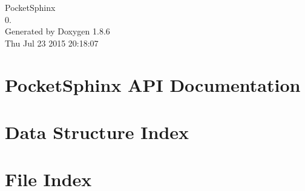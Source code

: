 \documentclass[twoside]{book}
\newcommand{\clearemptydoublepage}{%
  \newpage{\pagestyle{empty}\cleardoublepage}%
}
\begin{document}
\begin{titlepage}
\vspace*{7cm}
\begin{center}%
{\Large Pocket\-Sphinx \\[1ex]\large 0. }\\
\vspace*{1cm}
{\large Generated by Doxygen 1.8.6}\\
\vspace*{0.5cm}
{\small Thu Jul 23 2015 20:18:07}\\
\end{center}
\end{titlepage}
\clearemptydoublepage
\tableofcontents
\clearemptydoublepage
{}

\chapter{Pocket\-Sphinx A\-P\-I Documentation}
\label{index}
\chapter{Data Structure Index}

\chapter{File Index}

\end{document}
